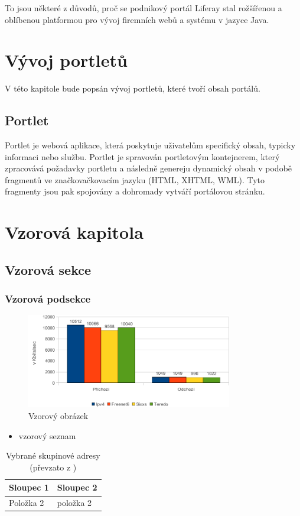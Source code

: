 \documentclass{fithesis}
\begin{document}
To jsou některé z důvodů, proč se podnikový portál Liferay stal rožšířenou a oblíbenou platformou pro vývoj firemních webů a systému v jazyce Java.

\chapter{Vývoj portletů}
V této kapitole bude popsán vývoj portletů, které tvoří obsah portálů.

\section{Portlet}
Portlet je webová aplikace, která poskytuje uživatelům specifický obsah, typicky informaci nebo službu. Portlet je spravován portletovým kontejnerem, který zpracovává požadavky portletu a následně genereju dynamický obsah v podobě fragmentů ve značkovačkovacím jazyku (HTML, XHTML, WML).  Tyto fragmenty jsou pak spojovány a dohromady vytváří portálovou stránku.

\chapter{Vzorová kapitola}
\section{Vzorová sekce}
\subsection{Vzorová podsekce}

\begin{figure}[htp]
\centering
\includegraphics[width=340px]{images/bandwith.pdf}
\caption{Vzorový obrázek}
\end{figure}

\begin{itemize}
\item vzorový seznam
\end{itemize}


\begin{table}
\centering
\begin{tabular}{|p{3cm}|p{8cm}|}
\hline Sloupec 1 & Sloupec 2 \\
\hline Položka 2 & položka 2 \\
\hline
\end{tabular}
\caption{Vybrané skupinové adresy (převzato z \cite{satrapa-ipv6})}
\end{table}
\end{document}
